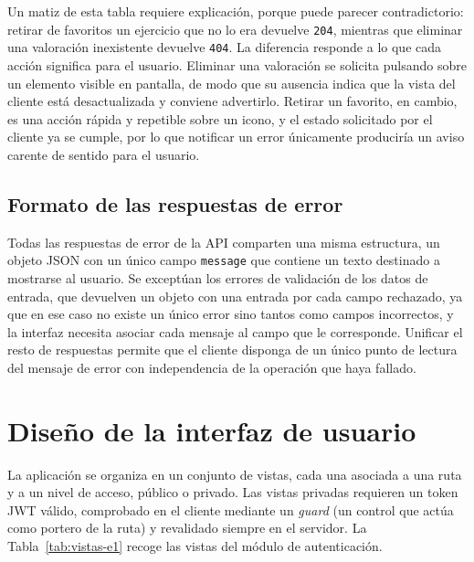 \documentclass[12pt,a4paper,twoside,openright]{book}
\begin{document}
    Un matiz de esta tabla requiere explicación, porque puede parecer
    contradictorio: retirar de favoritos un ejercicio que no lo era devuelve
    \texttt{204}, mientras que eliminar una valoración inexistente devuelve
    \texttt{404}. La diferencia responde a lo que cada acción significa para el
    usuario. Eliminar una valoración se solicita pulsando sobre un elemento
    visible en pantalla, de modo que su ausencia indica que la vista del
    cliente está desactualizada y conviene advertirlo. Retirar un favorito, en
    cambio, es una acción rápida y repetible sobre un icono, y el estado
    solicitado por el cliente ya se cumple, por lo que notificar un error
    únicamente produciría un aviso carente de sentido para el usuario.

    \subsection{Formato de las respuestas de error}

    Todas las respuestas de error de la API comparten una misma estructura, un
    objeto JSON con un único campo \texttt{message} que contiene un texto
    destinado a mostrarse al usuario. Se exceptúan los errores de validación de
    los datos de entrada, que devuelven un objeto con una entrada por cada
    campo rechazado, ya que en ese caso no existe un único error sino tantos
    como campos incorrectos, y la interfaz necesita asociar cada mensaje al
    campo que le corresponde. Unificar el resto de respuestas permite que el
    cliente disponga de un único punto de lectura del mensaje de error con
    independencia de la operación que haya fallado.

    \section{Diseño de la interfaz de usuario}

    La aplicación se organiza en un conjunto de vistas, cada una asociada a una
    ruta y a un nivel de acceso, público o privado. Las vistas privadas requieren
    un token JWT válido, comprobado en el cliente mediante un \textit{guard}
    (un control que actúa como portero de la ruta) y revalidado siempre en el servidor.
    La Tabla~\ref{tab:vistas-e1} recoge las vistas del módulo de autenticación.
\end{document}
